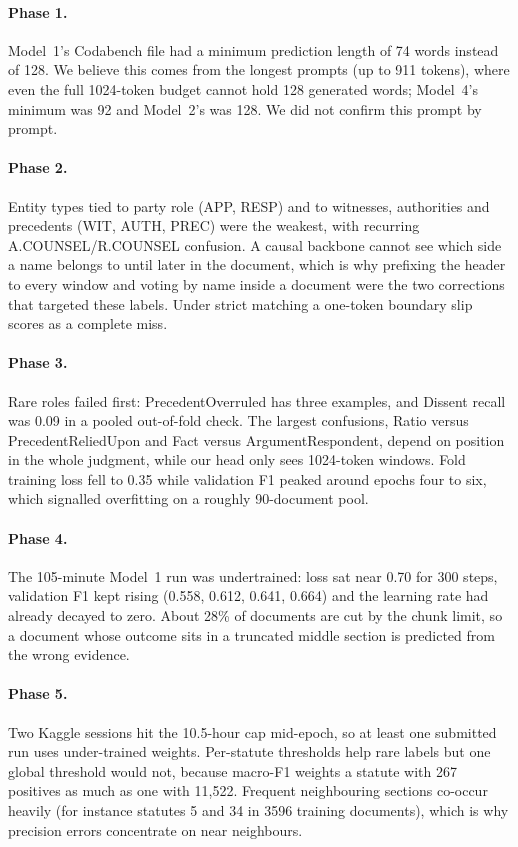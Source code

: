 \documentclass[11pt, oneside]{article}
\begin{document}
\paragraph{Phase 1.} Model~1's Codabench file had a minimum prediction length of 74 words instead of 128. We believe this comes from the longest prompts (up to 911 tokens), where even the full 1024-token budget cannot hold 128 generated words; Model~4's minimum was 92 and Model~2's was 128. We did not confirm this prompt by prompt.

\paragraph{Phase 2.} Entity types tied to party role (APP, RESP) and to witnesses, authorities and precedents (WIT, AUTH, PREC) were the weakest, with recurring A.COUNSEL/R.COUNSEL confusion. A causal backbone cannot see which side a name belongs to until later in the document, which is why prefixing the header to every window and voting by name inside a document were the two corrections that targeted these labels. Under strict matching a one-token boundary slip scores as a complete miss.

\paragraph{Phase 3.} Rare roles failed first: PrecedentOverruled has three examples, and Dissent recall was 0.09 in a pooled out-of-fold check. The largest confusions, Ratio versus PrecedentReliedUpon and Fact versus ArgumentRespondent, depend on position in the whole judgment, while our head only sees 1024-token windows. Fold training loss fell to 0.35 while validation F1 peaked around epochs four to six, which signalled overfitting on a roughly 90-document pool.

\paragraph{Phase 4.} The 105-minute Model~1 run was undertrained: loss sat near 0.70 for 300 steps, validation F1 kept rising (0.558, 0.612, 0.641, 0.664) and the learning rate had already decayed to zero. About 28\% of documents are cut by the chunk limit, so a document whose outcome sits in a truncated middle section is predicted from the wrong evidence.

\paragraph{Phase 5.} Two Kaggle sessions hit the 10.5-hour cap mid-epoch, so at least one submitted run uses under-trained weights. Per-statute thresholds help rare labels but one global threshold would not, because macro-F1 weights a statute with 267 positives as much as one with 11{,}522. Frequent neighbouring sections co-occur heavily (for instance statutes 5 and 34 in 3596 training documents), which is why precision errors concentrate on near neighbours.
\end{document}
